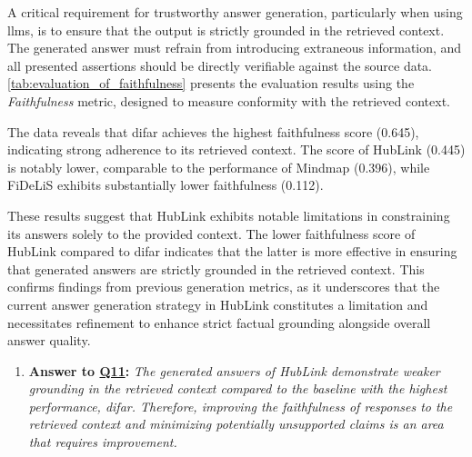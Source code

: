 A critical requirement for trustworthy answer generation, particularly when using \glspl{llm}, is to ensure that the output is strictly grounded in the retrieved context. The generated answer must refrain from introducing extraneous information, and all presented assertions should be directly verifiable against the source data. \autoref{tab:evaluation_of_faithfulness} presents the evaluation results using the \emph{Faithfulness} metric, designed to measure conformity with the retrieved context.

The data reveals that \gls{difar} achieves the highest faithfulness score (0.645), indicating strong adherence to its retrieved context. The score of HubLink (0.445) is notably lower, comparable to the performance of Mindmap (0.396), while FiDeLiS exhibits substantially lower faithfulness (0.112).

These results suggest that HubLink exhibits notable limitations in constraining its answers solely to the provided context. The lower faithfulness score of HubLink compared to \gls{difar} indicates that the latter is more effective in ensuring that generated answers are strictly grounded in the retrieved context. This confirms findings from previous generation metrics, as it underscores that the current answer generation strategy in HubLink constitutes a limitation and necessitates refinement to enhance strict factual grounding alongside overall answer quality.

\begin{enumerate}[label={}] 
 \item \textbf{Answer to \hyperref[sec:evaluation_gqm_plan]{Q11}:} \textit{The generated answers of HubLink demonstrate weaker grounding in the retrieved context compared to the baseline with the highest performance, \gls{difar}. Therefore, improving the faithfulness of responses to the retrieved context and minimizing potentially unsupported claims is an area that requires improvement.} 
\end{enumerate}
